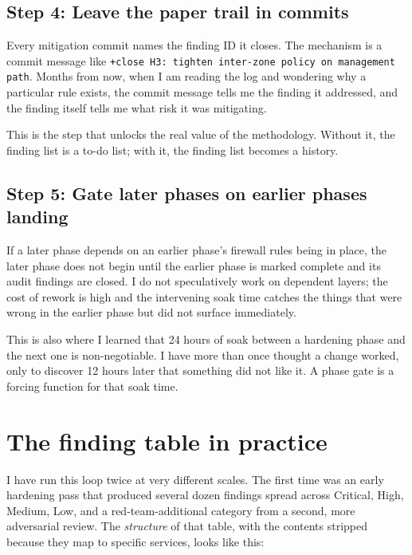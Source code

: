 \documentclass[12pt]{article}
\begin{document}
\subsection{Step 4: Leave the paper trail in commits}

Every mitigation commit names the finding ID it closes. The mechanism is a commit message like \texttt{+close H3: tighten inter-zone policy on management path}. Months from now, when I am reading the log and wondering why a particular rule exists, the commit message tells me the finding it addressed, and the finding itself tells me what risk it was mitigating.

This is the step that unlocks the real value of the methodology. Without it, the finding list is a to-do list; with it, the finding list becomes a history.

\subsection{Step 5: Gate later phases on earlier phases landing}

If a later phase depends on an earlier phase's firewall rules being in place, the later phase does not begin until the earlier phase is marked complete and its audit findings are closed. I do not speculatively work on dependent layers; the cost of rework is high and the intervening soak time catches the things that were wrong in the earlier phase but did not surface immediately.

This is also where I learned that 24 hours of soak between a hardening phase and the next one is non-negotiable. I have more than once thought a change worked, only to discover 12 hours later that something did not like it. A phase gate is a forcing function for that soak time.

\section{The finding table in practice}

I have run this loop twice at very different scales. The first time was an early hardening pass that produced several dozen findings spread across Critical, High, Medium, Low, and a red-team-additional category from a second, more adversarial review. The \emph{structure} of that table, with the contents stripped because they map to specific services, looks like this:
\end{document}
